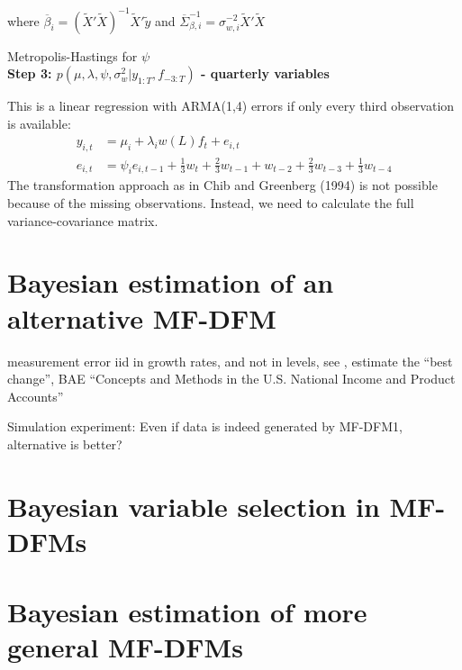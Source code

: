 where $\overline{\beta}_i = (\tilde{X}'\tilde{X})^{-1}\tilde{X}'\tilde{y}$ and $\overline{\Sigma}^{-1}_{\beta,i}= \sigma_{w,i}^{-2} \tilde{X}'\tilde{X}$

Metropolis-Hastings for $\psi$\\

\textbf{Step 3: $p(\mu, \lambda, \psi, \sigma_{w}^2|y_{1:T}, f_{-3:T})$ - quarterly variables}

This is a linear regression with ARMA(1,4) errors if only every third observation is available:
\begin{align}
y_{i,t} &= \mu_i + \lambda_i w(L)f_t + e_{i,t} \\
e_{i,t} &= \psi_i e_{i,t-1} + \frac{1}{3}w_t + \frac{2}{3}w_{t-1} + w_{t-2} + \frac{2}{3}w_{t-3} + \frac{1}{3}w_{t-4}
\end{align}
The transformation approach as in Chib and Greenberg (1994) is not possible because of the missing observations. Instead, we need to calculate the full variance-covariance matrix.

\section{Bayesian estimation of an alternative MF-DFM}

measurement error iid in growth rates, and not in levels, see \citet[section 3]{AruobaEtal2016}, estimate the ``best change'', BAE ``Concepts and Methods in the U.S. National Income and Product Accounts''

Simulation experiment: Even if data is indeed generated by MF-DFM1, alternative is better?

\section{Bayesian variable selection in MF-DFMs}






\section{Bayesian estimation of more general MF-DFMs}

